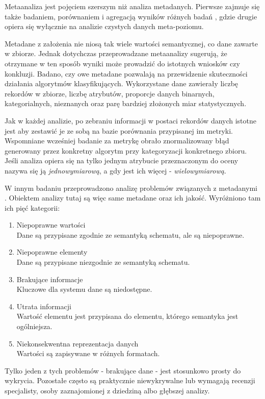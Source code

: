 	Metaanaliza jest pojęciem szerszym niż analiza metadanych.
	Pierwsze zajmuje się także badaniem, porównaniem i agregacją wyników różnych badań \cite{rosenthal2002meta}, gdzie drugie opiera się wyłącznie na analizie czystych danych meta-poziomu.

	Metadane z założenia nie niosą tak wiele wartości semantycznej, co dane zawarte w zbiorze.
	Jednak dotychczas przeprowadzane metaanalizy sugerują, że otrzymane w ten sposób wyniki może prowadzić do istotnych wniosków czy konkluzji.
	Badano, czy owe metadane pozwalają na przewidzenie skuteczności działania algorytmów klasyfikujących.
	Wykorzystane dane zawierały liczbę rekordów w zbiorze, liczbę atrybutów, proporcje danych binarnych, kategorialnych, nieznanych oraz parę bardziej złożonych miar statystycznych.

	Jak w każdej analizie, po zebraniu informacji w postaci rekordów danych istotne jest aby zestawić je ze sobą na bazie porównania przypisanej im metryki.
	Wspomniane wcześniej badanie \cite{brazdil1994characterizing} za metrykę obrało znormalizowany błąd generowany przez konkretny algorytm przy kategoryzacji konkretnego zbioru.
	Jeśli analiza opiera się na tylko jednym atrybucie przeznaczonym do oceny nazywa się ją \emph{jednowymiarową}, a gdy jest ich więcej - \emph{wielowymiarową}.

	W innym badaniu przeprowadzono analizę problemów związanych z metadanymi \cite{yasser2011analysis}.
	Obiektem analizy tutaj są więc same metadane oraz ich jakość.
	Wyróżniono tam ich pięć kategorii:

	\begin{enumerate}
		\item Niepoprawne wartości \\
		Dane są przypisane zgodnie ze semantyką schematu, ale są niepoprawne.

		\item Niepoprawne elementy \\
		Dane są przypisane niezgodnie ze semantyką schematu.

		\item Brakujące informacje \\
		Kluczowe dla systemu dane są niedostępne.

		\item Utrata informacji \\
		Wartość elementu jest przypisana do elementu, którego semantyka jest ogólniejsza.

		\item Niekonsekwentna reprezentacja danych \\
		Wartości są zapisywane w różnych formatach.
	\end{enumerate}

	Tylko jeden z tych problemów - brakujące dane - jest stosunkowo prosty do wykrycia.
	Pozostałe często są praktycznie niewykrywalne lub wymagają recenzji specjalisty, osoby zaznajomionej z dziedziną albo głębszej analizy.
